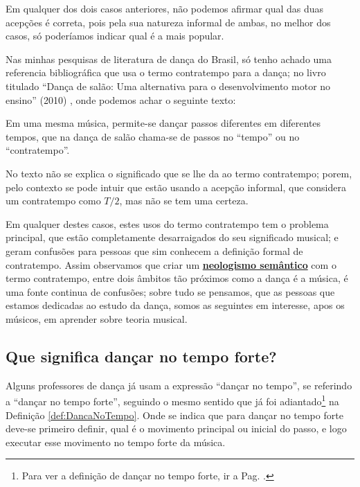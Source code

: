 Em qualquer dos dois casos anteriores, não podemos afirmar qual das duas acepções é correta,
pois pela sua natureza informal de ambas,
no melhor dos casos, só poderíamos indicar qual é a mais popular.

Nas minhas pesquisas de literatura de dança do Brasil, 
só tenho achado uma referencia bibliográfica que usa o termo contratempo para a dança;
no livro titulado ``Dança de salão: Uma alternativa para o desenvolvimento motor no ensino'' 
(2010) \cite{maia2010danca}, onde podemos achar o seguinte texto:
\begin{citando}
Em uma mesma música, permite-se dançar passos diferentes em diferentes tempos,
que na dança de salão chama-se de passos no ``tempo'' ou no ``contratempo''.
\end{citando}
No texto não se explica o significado que se lhe da ao termo contratempo;
porem, pelo contexto se pode intuir que estão usando a acepção informal, 
que considera um contratempo como $T/2$, mas não se tem uma certeza.

Em qualquer destes casos, 
estes usos do termo contratempo tem o problema principal, 
que estão completamente desarraigados do seu significado musical;
e geram confusões para pessoas que sim conhecem a definição formal de contratempo.
Assim observamos que criar um 
\hyperref[def:NeologismoSemantico]{\textbf{neologismo semântico}} com o termo contratempo, 
entre dois âmbitos tão próximos como a dança é a música, é uma fonte continua de confusões;
sobre tudo se pensamos, que as pessoas que estamos dedicadas ao estudo da dança,
somos as seguintes em interesse, apos os músicos, em aprender sobre teoria musical.


\subsection{Que significa dançar no tempo forte?}
\label{subsec:dancatempoforte}
Alguns professores de dança já usam a expressão ``dançar no tempo'', 
se referindo a ``dançar no tempo forte'', seguindo o mesmo sentido que já foi adiantado\footnote{Para 
ver a definição de dançar no tempo forte, ir a Pag. \pageref{def:DancaNoTempo}.}
 na Definição \ref{def:DancaNoTempo}.
Onde se indica que para dançar no tempo forte deve-se primeiro definir,
 qual é o movimento principal ou inicial do passo,
e logo executar esse movimento no tempo forte da música.


